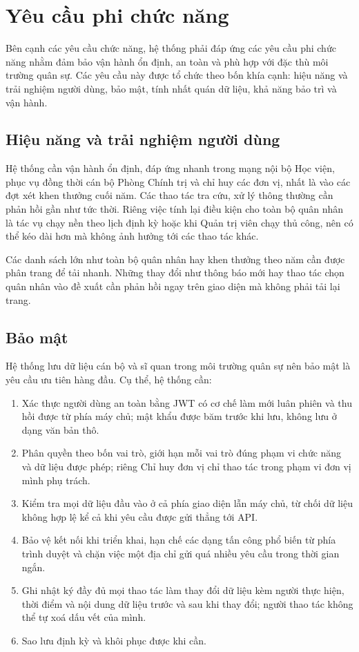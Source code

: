 \documentclass[../DoAn.tex]{subfiles}
\begin{document}
\section{Yêu cầu phi chức năng}
\label{section:2.4}

Bên cạnh các yêu cầu chức năng, hệ thống phải đáp ứng các yêu cầu phi chức năng nhằm đảm bảo vận hành ổn định, an toàn và phù hợp với đặc thù môi trường quân sự.
Các yêu cầu này được tổ chức theo bốn khía cạnh: hiệu năng và trải nghiệm người dùng, bảo mật, tính nhất quán dữ liệu, khả năng bảo trì và vận hành.

\subsection{Hiệu năng và trải nghiệm người dùng}
\label{subsection:2.4.1}

Hệ thống cần vận hành ổn định, đáp ứng nhanh trong mạng nội bộ Học viện, phục vụ đồng thời cán bộ Phòng Chính trị và chỉ huy các đơn vị, nhất là vào các đợt xét khen thưởng cuối năm.
Các thao tác tra cứu, xử lý thông thường cần phản hồi gần như tức thời. Riêng việc tính lại điều kiện cho toàn bộ quân nhân là tác vụ chạy nền theo lịch định kỳ hoặc khi Quản trị viên chạy thủ công, nên có thể kéo dài hơn mà không ảnh hưởng tới các thao tác khác.

Các danh sách lớn như toàn bộ quân nhân hay khen thưởng theo năm cần được phân trang để tải nhanh.
Những thay đổi như thông báo mới hay thao tác chọn quân nhân vào đề xuất cần phản hồi ngay trên giao diện mà không phải tải lại trang.

\subsection{Bảo mật}
\label{subsection:2.4.2}

Hệ thống lưu dữ liệu cán bộ và sĩ quan trong môi trường quân sự nên bảo mật là yêu cầu ưu tiên hàng đầu.
Cụ thể, hệ thống cần:

\begin{enumerate}
    \item Xác thực người dùng an toàn bằng JWT có cơ chế làm mới luân phiên và thu hồi được từ phía máy chủ; mật khẩu được băm trước khi lưu, không lưu ở dạng văn bản thô.
    \item Phân quyền theo bốn vai trò, giới hạn mỗi vai trò đúng phạm vi chức năng và dữ liệu được phép; riêng Chỉ huy đơn vị chỉ thao tác trong phạm vi đơn vị mình phụ trách.
    \item Kiểm tra mọi dữ liệu đầu vào ở cả phía giao diện lẫn máy chủ, từ chối dữ liệu không hợp lệ kể cả khi yêu cầu được gửi thẳng tới API.
    \item Bảo vệ kết nối khi triển khai, hạn chế các dạng tấn công phổ biến từ phía trình duyệt và chặn việc một địa chỉ gửi quá nhiều yêu cầu trong thời gian ngắn.
    \item Ghi nhật ký đầy đủ mọi thao tác làm thay đổi dữ liệu kèm người thực hiện, thời điểm và nội dung dữ liệu trước và sau khi thay đổi; người thao tác không thể tự xoá dấu vết của mình.
    \item Sao lưu định kỳ và khôi phục được khi cần.
\end{enumerate}
\end{document}
